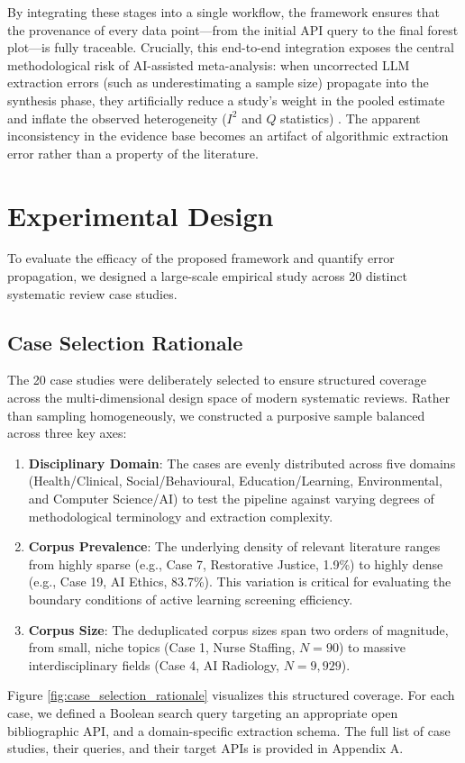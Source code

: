 \documentclass[12pt]{article}
\begin{document}
By integrating these stages into a single workflow, the framework ensures that the provenance of every data point---from the initial API query to the final forest plot---is fully traceable. Crucially, this end-to-end integration exposes the central methodological risk of AI-assisted meta-analysis: when uncorrected LLM extraction errors (such as underestimating a sample size) propagate into the synthesis phase, they artificially reduce a study's weight in the pooled estimate and inflate the observed heterogeneity ($I^2$ and $Q$ statistics) \citep{higgins2002heterogeneity, dersimonian1986metaanalysis}. The apparent inconsistency in the evidence base becomes an artifact of algorithmic extraction error rather than a property of the literature.

\section{Experimental Design}

To evaluate the efficacy of the proposed framework and quantify error propagation, we designed a large-scale empirical study across 20 distinct systematic review case studies. 

\subsection{Case Selection Rationale}

The 20 case studies were deliberately selected to ensure structured coverage across the multi-dimensional design space of modern systematic reviews. Rather than sampling homogeneously, we constructed a purposive sample balanced across three key axes:
\begin{enumerate}
    \item \textbf{Disciplinary Domain}: The cases are evenly distributed across five domains (Health/Clinical, Social/Behavioural, Education/Learning, Environmental, and Computer Science/AI) to test the pipeline against varying degrees of methodological terminology and extraction complexity.
    \item \textbf{Corpus Prevalence}: The underlying density of relevant literature ranges from highly sparse (e.g., Case 7, Restorative Justice, 1.9\%) to highly dense (e.g., Case 19, AI Ethics, 83.7\%). This variation is critical for evaluating the boundary conditions of active learning screening efficiency.
    \item \textbf{Corpus Size}: The deduplicated corpus sizes span two orders of magnitude, from small, niche topics (Case 1, Nurse Staffing, $N=90$) to massive interdisciplinary fields (Case 4, AI Radiology, $N=9,929$).
\end{enumerate}
Figure \ref{fig:case_selection_rationale} visualizes this structured coverage. For each case, we defined a Boolean search query targeting an appropriate open bibliographic API, and a domain-specific extraction schema. The full list of case studies, their queries, and their target APIs is provided in Appendix A. 
\end{document}
